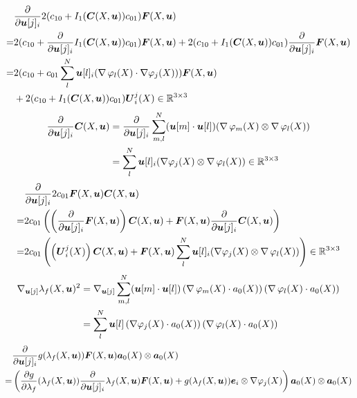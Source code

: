 \begin{align*}	 
	 &\d{}{\vu[j]_i}2(c_{10} + I_1(\vC(X,\vu))c_{01})\vF(X,\vu)\\
	 =& 2(c_{10} + \d{}{\vu[j]_i}I_1(\vC(X,\vu))c_{01})\vF(X,\vu) + 2(c_{10} + I_1(\vC(X,\vu))c_{01})\d{}{\vu[j]_i}\vF(X,\vu)\\
	 =& 2(c_{10} + c_{01}\suml{l}{N} \vu[l]_i(\divergence\varphi_l(X) \cdot \dpj))\vF(X,\vu)\\
	 &+ 2(c_{10} + I_1(\vC(X,\vu))c_{01})\vU^j_i(X)\in\R^{3\times 3}
\end{align*}
\begin{align*}
	\d{}{\vu[j]_i}\vC(X,\vu) &= \d{}{\vu[j]_i}\suml{m,l}{N} (\vu[m] \cdot \vu[l])(\divergence\varphi_m(X) \otimes \divergence\varphi_l(X))\\
	&= \suml{l}{N} \vu[l]_i(\dpj \otimes \divergence\varphi_l(X))\in\R^{3\times 3}
\end{align*}
\begin{align*}
	&\d{}{\vu[j]_i}2c_{01}\vF(X,\vu)\vC(X,\vu)\\
	=& 2c_{01}\left(\left(\d{}{\vu[j]_i}\vF(X,\vu)\right)\vC(X,\vu) + \vF(X,\vu)\d{}{\vu[j]_i}\vC(X,\vu)\right)\\
	=& 2c_{01}\left(\left(\vU^j_i(X)\right)\vC(X,\vu)
	+ \vF(X,\vu)\suml{l}{N} \vu[l]_i(\dpj \otimes \divergence\varphi_l(X))\right)\in\R^{3\times 3}
\end{align*}
\begin{align*}
	\nabla_{\vu[j]}\lambda_f(X,\vu)^2 &= \nabla_{\vu[j]}\suml{m,l}{N} (\vu[m] \cdot \vu[l])\left(\divergence\varphi_m(X)\cdot a_0(X)\right)(\divergence\varphi_l(X)\cdot a_0(X))\\
	&= \suml{l}{N} \vu[l]\left(\dpj\cdot a_0(X)\right)(\divergence\varphi_l(X)\cdot a_0(X))\\
\end{align*}
\begin{align*}
	  & \d{}{\vu[j]_i} g(\lambda_f(X,\vu))\vF(X,\vu)\va_0(X)\otimes\va_0(X)\\
	 =& \left( \d{g}{\lambda_f}(\lambda_f(X,\vu))\d{}{\vu[j]_i}\lambda_f(X,\vu)\vF(X,\vu) + g(\lambda_f(X,\vu))\ve_i\otimes\dpj\right)\va_0(X)\otimes\va_0(X) 
\end{align*}

